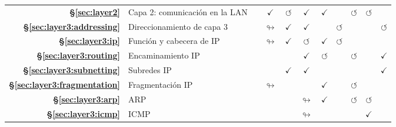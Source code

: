 {\begin{tabular}{rl ccccccccc}
    \textbf{\S\ref{sec:layer2}}    & Capa 2: comunicación en la LAN                       &                   & $\checkmark$       & $\circlearrowleft$ & $\checkmark$       & $\checkmark$       &                      & $\circlearrowleft$      & $\circlearrowleft$   &                      \\
    \rowcolor{color1!15!white}
    \textbf{\S\ref{sec:layer3:addressing}}  & Direccionamiento de capa 3                               &                   & $\looparrowright$  & $\checkmark$       & $\checkmark$       &                    & $\circlearrowleft$   &                         &                      & $\circlearrowleft$   \\
    \textbf{\S\ref{sec:layer3:ip}}  & Función y cabecera de IP                                               &                   & $\looparrowright$  & $\checkmark$       & $\circlearrowleft$ & $\checkmark$       & $\circlearrowleft$   &                         &                      &                      \\
    \rowcolor{color1!15!white}
    \textbf{\S\ref{sec:layer3:routing}}  & Encaminamiento IP                                       &                   &                    &                    & $\checkmark$       & $\circlearrowleft$ &                      & $\circlearrowleft$      &                      & $\checkmark$         \\
    \textbf{\S\ref{sec:layer3:subnetting}}  & Subredes IP                                    &                   &                    & $\checkmark$       & $\checkmark$       &                    &                      &                         &                      & $\checkmark$         \\
    \rowcolor{color1!15!white}
    \textbf{\S\ref{sec:layer3:fragmentation}}  & Fragmentación IP                                 &                   & $\looparrowright$  &                    &                    & $\checkmark$       &                      & $\circlearrowleft$      &                      &                      \\
    \textbf{\S\ref{sec:layer3:arp}}  & ARP                                              &                   &                    &                    & $\looparrowright$  & $\checkmark$       &                      & $\circlearrowleft$      & $\circlearrowleft$   &                      \\
    \rowcolor{color1!15!white}
    \textbf{\S\ref{sec:layer3:icmp}}  & ICMP                                             &                   &                    &                    & $\looparrowright$  &                    &                      &                         & $\checkmark$         &                      \\

\end{tabular}}
